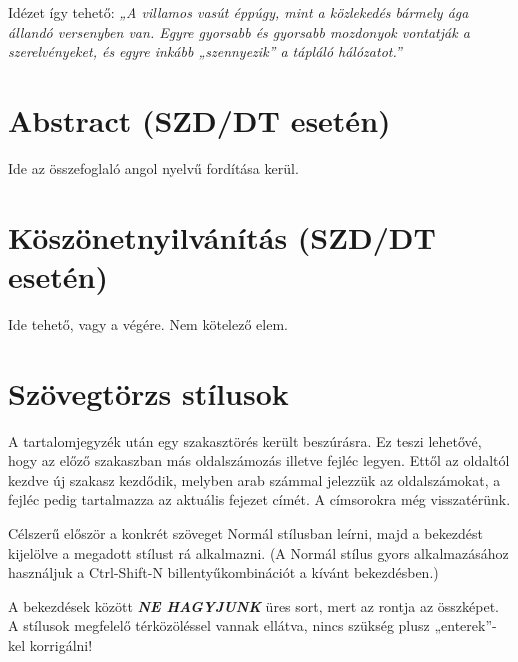 \documentclass[a4paper, 12pt]{article}
\renewcommand{\headrulewidth}{0pt}
\begin{document}
	\par
	Idézet így tehető: \textit{„A villamos vasút éppúgy, mint a közlekedés bármely ága állandó versenyben van. Egyre gyorsabb és gyorsabb mozdonyok vontatják a szerelvényeket, és egyre inkább „szennyezik” a tápláló hálózatot.”} \cite{ART:1}

	\newpage

	\section*{Abstract (SZD/DT esetén)}

	Ide az összefoglaló angol nyelvű fordítása kerül.

	\newpage

	\section*{Köszönetnyilvánítás (SZD/DT esetén)}

	Ide tehető, vagy a végére. Nem kötelező elem.

	\newpage
	\renewcommand{\headrulewidth}{0.5pt}
	\tableofcontents
	\newpage

	\setcounter{page}{8}
	
	\section{Szövegtörzs stílusok}
	A tartalomjegyzék után egy szakasztörés került beszúrásra.
	Ez teszi lehetővé, hogy az előző szakaszban más oldalszámozás illetve fejléc legyen.
	Ettől az oldaltól kezdve új szakasz kezdődik, melyben arab számmal jelezzük az oldalszámokat, a fejléc pedig tartalmazza az aktuális fejezet címét.
	A címsorokra még visszatérünk.
	\par
	Célszerű először a konkrét szöveget Normál stílusban leírni, majd a bekezdést kijelölve a megadott stílust rá alkalmazni.
	(A Normál stílus gyors alkalmazásához használjuk a Ctrl-Shift-N billentyűkombinációt a kívánt bekezdésben.)
	\par
	A bekezdések között \textbf{\textit{\textcolor{bme}{NE HAGYJUNK}}} üres sort, mert az rontja az összképet.
	A stílusok megfelelő térközöléssel vannak ellátva, nincs szükség plusz „enterek”-kel korrigálni!
\end{document}
